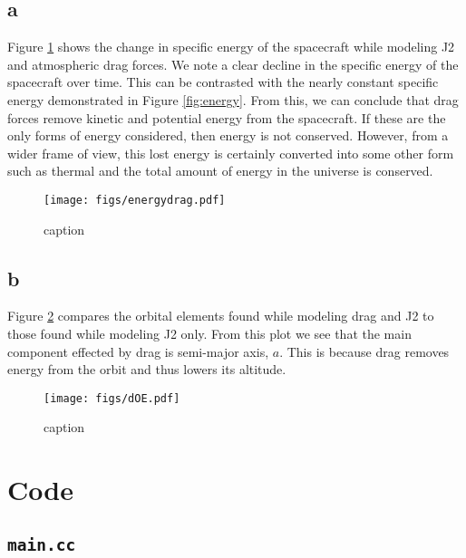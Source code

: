 \documentclass[11pt]{article}
\begin{document}
\subsection{a}

Figure \ref{fig:energydrag} shows the change in specific energy of the spacecraft while modeling J2 and atmospheric drag forces. We note a clear decline in the specific energy of the spacecraft over time. This can be contrasted with the nearly constant specific energy demonstrated in Figure \ref{fig:energy}. From this, we can conclude that drag forces remove kinetic and potential energy from the spacecraft. If these are the only forms of energy considered, then energy is not conserved. However, from a wider frame of view, this lost energy is certainly converted into some other form such as thermal and the total amount of energy in the universe is conserved. \\

\begin{figure}[h!]
	\centering
	\texttt{[image: figs/energydrag.pdf]}
	\caption{caption}
	\label{fig:energydrag}
\end{figure}

\subsection{b}

Figure \ref{fig:dOE} compares the orbital elements found while modeling drag and J2 to those found while modeling J2 only. From this plot we see that the main component effected by drag is semi-major axis, $a$. This is because drag removes energy from the orbit and thus lowers its altitude. \\

\begin{figure}[h!]
	\centering
	\texttt{[image: figs/dOE.pdf]}
	\caption{caption}
	\label{fig:dOE}
\end{figure}

\newpage
\appendix
\section{Code}

\subsection{\texttt{main.cc}}

\end{document}
